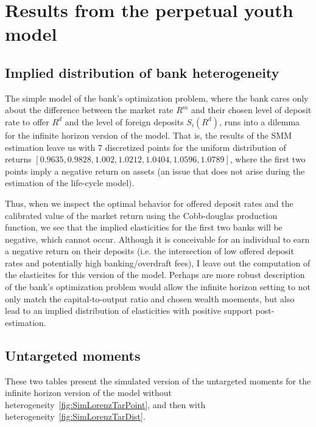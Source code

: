 \section{Results from the perpetual youth model}


\subsection{Implied distribution of bank heterogeneity}

\par The simple model of the bank's optimization problem, where the bank cares only about the difference between the market rate  $R^m$  and their chosen level of deposit rate to offer $R^d$  and the level of foreign deposits $S_i(R^d)$, runs into a dilemma for the infinite horizon version of the model. That is, the results of the SMM estimation leave us with 7 discretized points for the uniform distribution of returns $[0.9635, 0.9828, 1.002, 1.0212, 1.0404, 1.0596, 1.0789]$, where the first two points imply a negative return on assets (an issue that does not arise during the estimation of the life-cycle model).

\par Thus, when we inspect the optimal behavior for offered deposit rates and the calibrated value of the market return using the Cobb-douglas production function, we see that the implied elasticities for the first two banks will be negative, which cannot occur. Although it is conceivable for an individual to earn a negative return on their deposits (i.e. the intersection of low offered deposit rates and potentially high banking/overdraft fees), I leave out the computation of the elasticites for this version of the model. Perhaps are more robust description of the bank's optimization problem would allow the infinite horizon setting to not only match the capital-to-output ratio and chosen wealth moements, but also lead to an implied distribution of elasticities with positive support post-estimation. 

\subsection{Untargeted moments}

\par These two tables present the simulated version of the untargeted moments for the infinite horizon version of the  model without heterogeneity~\ref{fig:SimLorenzTarPoint}, and then with heterogeneity~\ref{fig:SimLorenzTarDist}.

